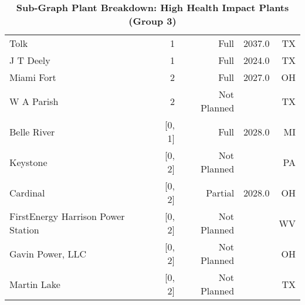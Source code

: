 \begin{table}[htb]
\begin{adjustbox}{width=\textwidth}
\begin{tabular}{|l|r|r|r|r|}
              Tolk &         1 &           Full &           2037.0 &    TX \\
         J T Deely &         1 &           Full &           2024.0 &   TX \\
        Miami Fort &         2 &           Full &           2027.0 &    OH \\
        W A Parish &         2 &           Not Planned &                &    TX \\
       Belle River &    [0, 1] &           Full &           2028.0 &    MI \\
          Keystone &    [0, 2] &           Not Planned &                &    PA \\
          Cardinal &    [0, 2] &           Partial &           2028.0 &    OH \\
FirstEnergy Harrison Power Station &    [0, 2] &           Not Planned &                &    WV \\
  Gavin Power, LLC &    [0, 2] &           Not Planned &                &    OH \\
       Martin Lake &    [0, 2] &           Not Planned &                &    TX \\
         \bottomrule
        \end{tabular}
      \end{adjustbox}
      \caption{\textbf{Sub-Graph Plant Breakdown: High Health Impact Plants (Group 3)} }
      \label{group3-subgraph-Table}
\end{table}


